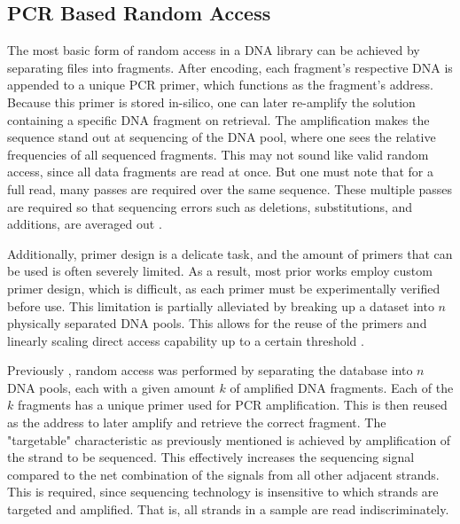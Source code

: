 \documentclass[a4paper,conference]{IEEEtran}
\begin{document}
\subsection{PCR Based Random Access}
The most basic form of random access in a DNA library can be achieved by separating files into fragments. After encoding, each fragment's respective DNA is appended to a unique PCR primer, which functions as the fragment's address. Because this primer is stored in-silico, one can later re-amplify the solution containing a specific DNA fragment on retrieval. The amplification makes the sequence stand out at sequencing of the DNA pool, where one sees the relative frequencies of all sequenced fragments. This may not sound like valid random access, since all data fragments are read at once. But one must note that for a full read, many passes are required over the same sequence. These multiple passes are required so that sequencing errors such as deletions, substitutions, and additions, are averaged out \cite{organick_random_2018}.

Additionally, primer design is a delicate task, and the amount of primers that can be used is often severely limited. As a result, most prior works employ custom primer design, which is difficult, as each primer must be experimentally verified before use. This limitation is partially alleviated by breaking up a dataset into $n$ physically separated DNA pools. This allows for the reuse of the primers and linearly scaling direct access capability up to a certain threshold \cite{tomek_driving_2019}.

Previously \cite{organick_random_2018,yazdi_rewritable_2015}, random access was performed by separating the database into $n$ DNA pools, each with a given amount $k$ of amplified DNA fragments. Each of the $k$ fragments has a unique primer used for PCR amplification. This is then reused as the address to later amplify and retrieve the correct fragment. The "targetable" characteristic as previously mentioned is achieved by amplification of the strand to be sequenced. This effectively increases the sequencing signal compared to the net combination of the signals from all other adjacent strands. This is required, since sequencing technology is insensitive to which strands are targeted and amplified. That is, all strands in a sample are read indiscriminately.

\end{document}
